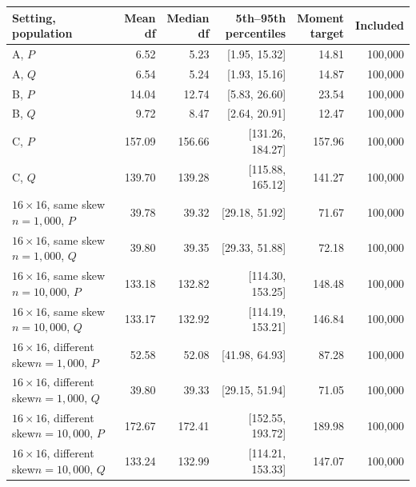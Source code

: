 \begin{tabularx}{\textwidth}{@{}>{\raggedright\arraybackslash}Xrrrrr@{}}
\toprule
Setting, population & \shortstack{Mean\\df} & \shortstack{Median\\df} & \shortstack{5th--95th\\percentiles} & \shortstack{Moment\\target} & Included\\
\midrule
A, \(P\) & 6.52 & 5.23 & [1.95, 15.32] & 14.81 & 100,000\\
A, \(Q\) & 6.54 & 5.24 & [1.93, 15.16] & 14.87 & 100,000\\
B, \(P\) & 14.04 & 12.74 & [5.83, 26.60] & 23.54 & 100,000\\
B, \(Q\) & 9.72 & 8.47 & [2.64, 20.91] & 12.47 & 100,000\\
C, \(P\) & 157.09 & 156.66 & [131.26, 184.27] & 157.96 & 100,000\\
C, \(Q\) & 139.70 & 139.28 & [115.88, 165.12] & 141.27 & 100,000\\
\(16\times16\), same skew\newline \(n=1{,}000\), \(P\) & 39.78 & 39.32 & [29.18, 51.92] & 71.67 & 100,000\\
\(16\times16\), same skew\newline \(n=1{,}000\), \(Q\) & 39.80 & 39.35 & [29.33, 51.88] & 72.18 & 100,000\\
\(16\times16\), same skew\newline \(n=10{,}000\), \(P\) & 133.18 & 132.82 & [114.30, 153.25] & 148.48 & 100,000\\
\(16\times16\), same skew\newline \(n=10{,}000\), \(Q\) & 133.17 & 132.92 & [114.19, 153.21] & 146.84 & 100,000\\
\(16\times16\), different skew\newline \(n=1{,}000\), \(P\) & 52.58 & 52.08 & [41.98, 64.93] & 87.28 & 100,000\\
\(16\times16\), different skew\newline \(n=1{,}000\), \(Q\) & 39.80 & 39.33 & [29.15, 51.94] & 71.05 & 100,000\\
\(16\times16\), different skew\newline \(n=10{,}000\), \(P\) & 172.67 & 172.41 & [152.55, 193.72] & 189.98 & 100,000\\
\(16\times16\), different skew\newline \(n=10{,}000\), \(Q\) & 133.24 & 132.99 & [114.21, 153.33] & 147.07 & 100,000\\
\bottomrule
\end{tabularx}
